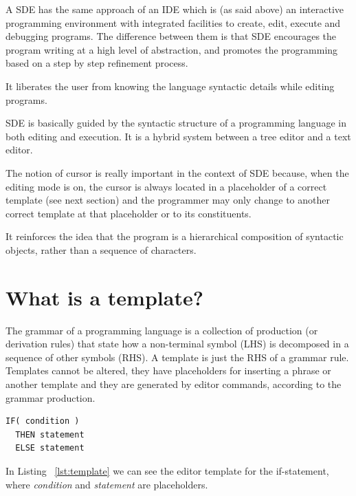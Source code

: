 \documentclass[
  oneside,
  11pt, a4paper,
  footinclude=true,
  headinclude=true,
  cleardoublepage=empty
]{scrbook}
\begin{document}
A SDE has the same approach of an IDE which is (as said above) an interactive programming environment with integrated facilities to create, edit, execute and debugging programs.
The difference between them is that SDE encourages the program writing at a high level of abstraction, and promotes the programming based on a step by step refinement process.

It liberates the user from knowing the language syntactic details while editing programs.

SDE is basically guided by the syntactic structure of a programming language in both editing and execution. It is a hybrid system between a tree editor and a text editor.

The notion of cursor is really important in the context of SDE because, when the editing mode is on, the cursor is always located in a placeholder of a correct template (see next section) and the programmer may only change to another correct template at that placeholder or to its constituents.%

It reinforces the idea that the program is a hierarchical composition of syntactic objects, rather than a sequence of characters.

\section {What is a template?}

The grammar of a programming language is a collection of production (or derivation rules) that state how a non-terminal symbol (LHS) is decomposed in a sequence of other symbols (RHS). A template is just the RHS of a grammar rule.
Templates cannot be altered, they have placeholders for inserting a phrase or another template and they are generated by editor commands, according to the grammar production. %


\begin{lstlisting}[caption={Example of a IF Conditional template},label={lst:template}]
IF( condition )
  THEN statement
  ELSE statement
\end{lstlisting}

In Listing ~\ref{lst:template} we can see the editor template for the if-statement, where \textit{condition} and \textit{statement} are placeholders.
\end{document}
